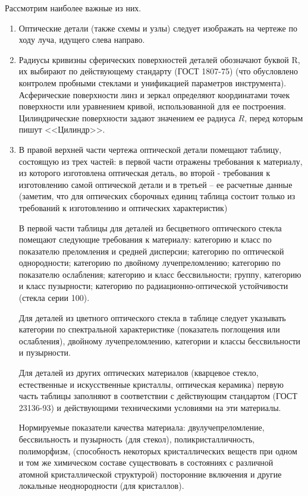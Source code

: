 Рассмотрим наиболее важные из них.
\begin{enumerate}
	\item Оптические детали (также схемы и узлы) следует изображать на чертеже по ходу луча, идущего слева направо.
	\item Радиусы кривизны сферических поверхностей деталей обозначают буквой R, их выбирают по действующему стандарту (ГОСТ 1807-75) (что обусловлено контролем пробными стеклами и унификацией параметров инструмента). Асферические поверхности линз и зеркал определяют координатами точек поверхности или уравнением кривой, использованной для ее построения. Цилиндрические поверхности задают значением ее радиуса $R$, перед которым пишут <<Цилиндр>>.
	\item В правой верхней части чертежа оптической детали помещают таблицу, состоящую из трех частей: в первой части отражены требования к материалу, из которого изготовлена оптическая деталь, во второй - требования к изготовлению самой оптической детали и в третьей -- ее расчетные данные (заметим, что для оптических сборочных единиц таблица состоит только из требований к изготовлению и оптических характеристик)
	
	В первой части таблицы для деталей из бесцветного оптического стекла помещают следующие требования к материалу: категорию и класс по показателю преломления и средней дисперсии; категорию по оптической однородности; категорию по двойному лучепреломлению; категорию по показателю ослабления; категорию и класс бессвильности; группу, категорию и класс пузырности; категорию по радиационно-оптической устойчивости (стекла серии 100).
	
	Для деталей из цветного оптического стекла в таблице следует указывать категории по спектральной характеристике (показатель поглощения или ослабления), двойному лучепреломлению, категории и классы бессвильности и пузырности.
	
	Для деталей из других оптических материалов (кварцевое стекло, естественные и искусственные кристаллы, оптическая керамика) первую часть таблицы заполняют в соответствии с действующим стандартом (ГОСТ 23136-93) и действующими техническими условиями на эти материалы.
	
	Нормируемые показатели качества материала: двулучепреломление, бессвильность и пузырность (для стекол), поликристалличность, полиморфизм, (способность некоторых кристаллических веществ при одном и том же химическом составе существовать в состояниях с различной атомной кристаллической структурой) посторонние включения и другие локальные неоднородности (для кристаллов).
	

\end{enumerate}
